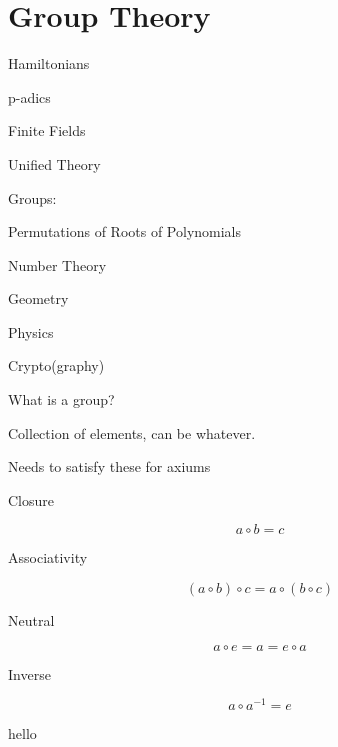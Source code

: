 \documentclass[11pt]{article}
\begin{document}
\section{Group Theory}

Hamiltonians

p-adics

Finite Fields

Unified Theory

Groups:

Permutations of Roots of Polynomials

Number Theory

Geometry

Physics

Crypto(graphy)

What is a group?

Collection of elements, can be whatever.

Needs to satisfy these for axiums

Closure

\begin{equation}
    a \circ b = c
\end{equation}

Associativity

\begin{equation}
    (a \circ b) \circ c = a \circ (b \circ c)
\end{equation}

Neutral

\begin{equation}
    a \circ e = a = e \circ a
\end{equation}

Inverse

\begin{equation}
    a \circ a^{-1} = e
\end{equation}

hello

\newpage
\printbibliography
\end{document}
